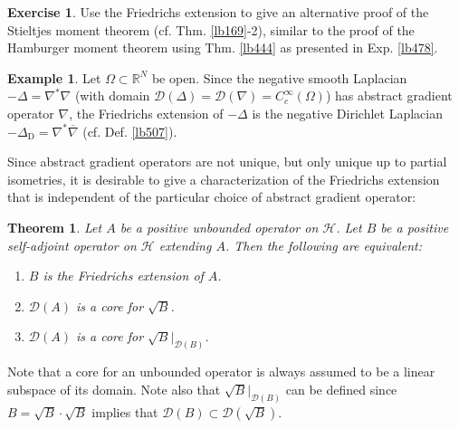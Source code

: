 \documentclass[12pt,b5paper,notitlepage]{article}
\theoremstyle{definition}
\newtheorem{eg}[df]{Example}
\newtheorem{exe}[df]{Exercise}
\theoremstyle{plain}
\newtheorem{thm}[df]{Theorem}
\newcommand{\ovl}{\overline}
\newcommand{\Dom}{\mathscr{D}}
\newcommand{\Rbb}{\mathbb R}
\newcommand{\MH}{\mathcal H}
\newcommand{\DD}{\Delta_{\mathrm D}}
\numberwithin{equation}{section}
\begin{document}
\begin{exe}
Use the Friedrichs extension to give an alternative proof of the Stieltjes moment theorem (cf. Thm. \ref{lb169}-2), similar to the proof of the Hamburger moment theorem using Thm. \ref{lb444} as presented in Exp. \ref{lb478}.
\end{exe}

\begin{eg}
Let $\Omega\subset\Rbb^N$ be open. Since the negative smooth Laplacian $-\Delta=\nabla^*\nabla$ (with domain $\Dom(\Delta)=\Dom(\nabla)=C_c^\infty(\Omega)$) has abstract gradient operator $\nabla$, the Friedrichs extension of $-\Delta$ is the negative Dirichlet Laplacian $-\DD=\nabla^*\ovl\nabla$ (cf. Def. \ref{lb507}).
\end{eg}



Since abstract gradient operators are not unique, but only unique up to partial isometries, it is desirable to give a characterization of the Friedrichs extension that is independent of the particular choice of abstract gradient operator:

\begin{thm}\label{lb473}
Let $A$ be a positive unbounded operator on $\MH$. Let $B$ be a positive self-adjoint operator on $\MH$ extending $A$. Then the following are equivalent:
\begin{enumerate}[label=(\arabic*)]
\item $B$ is the Friedrichs extension of $A$.
\item $\Dom(A)$ is a core for $\sqrt B$.
\item $\Dom(A)$ is a core for $\sqrt B\big|_{\Dom(B)}$.
\end{enumerate}
\end{thm}

Note that a core for an unbounded operator is always assumed to be a linear subspace of its domain. Note also that $\sqrt B\big|_{\Dom(B)}$ can be defined since $B=\sqrt B\cdot\sqrt B$ implies that $\Dom(B)\subset\Dom(\sqrt B)$.
\end{document}
